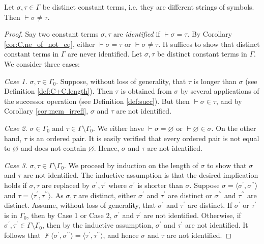 \begin{theorem}
    \label{thm:C.ne_of_isInΓ_and_distinct}
    \leanok
    Let $\sigma, \tau \in \Gamma$ be distinct constant terms, i.e. they are different strings of
    symbols. Then $\vdash \sigma \neq \tau$.
\end{theorem}

\begin{proof}
    Say two constant terms $\sigma, \tau$ are \textit{identified} if $\vdash \sigma = \tau$.
    By Corollary \ref{cor:C.ne_of_not_eq}, 
    either $\vdash \sigma = \tau$ or $\vdash \sigma \neq \tau$.
    It suffices to show that distinct constant terms in $\Gamma$ are never identified.
    Let $\sigma,\tau$ be distinct constant terms in $\Gamma$.
    We consider three cases:

    \textit{Case 1.} $\sigma, \tau \in \Gamma_0$. 
    Suppose, without loss of generality, that $\tau$ is longer than $\sigma$ 
    (see Definition \ref{def:C+C.length}).
    Then $\tau$ is obtained from $\sigma$ by several applications of the successor operation
    (see Definition \ref{def:succ}).
    But then $\vdash \sigma \in \tau$, and by Corollary \ref{cor:mem_irrefl},
    $\sigma$ and $\tau$ are not identified.

    \textit{Case 2.} $\sigma \in \Gamma_0$ and $\tau \in \Gamma \setminus \Gamma_0$.
    We either have $\vdash \sigma = \varnothing$ or $\vdash \varnothing \in \sigma$.
    On the other hand, $\tau$ is an ordered pair.
    It is easily verified that every ordered pair is not equal to $\varnothing$ and does not contain
    $\varnothing$. Hence, $\sigma$ and $\tau$ are not identified.

    \textit{Case 3.} $\sigma, \tau \in \Gamma \setminus \Gamma_0$.
    We proceed by induction on the length of $\sigma$ to show that 
    $\sigma$ and $\tau$ are not identified.
    The inductive assumption is that the desired implication holds if $\sigma, \tau$ are replaced by
    $\sigma^\prime, \tau^\prime$ where $\sigma^\prime$ is shorter than $\sigma$.
    Suppose $\sigma = \langle \sigma^\prime, \sigma^{\prime\prime} \rangle$ and 
    $\tau = \langle \tau^\prime, \tau^{\prime\prime} \rangle$.
    As $\sigma,\tau$ are distinct, either $\sigma^\prime$ and $\tau^\prime$ are distinct or
    $\sigma^{\prime\prime}$ and $\tau^{\prime\prime}$ are distinct.
    Assume, without loss of generality, that $\sigma^\prime$ and $\tau^\prime$ are distinct.
    If $\sigma^\prime$ or $\tau^\prime$ is in $\Gamma_0$, then by Case 1 or Case 2,
    $\sigma^\prime$ and $\tau^\prime$ are not identified.
    Otherwise, if $\sigma^\prime, \tau^\prime \in \Gamma \setminus \Gamma_0$, then by the inductive
    assumption, $\sigma^\prime$ and $\tau^\prime$ are not identified.
    It follows that $\not\vdash \langle \sigma^\prime, \sigma^{\prime\prime} \rangle =
    \langle \tau^\prime, \tau^{\prime\prime} \rangle$, and hence $\sigma$ and $\tau$ are not
    identified.
\end{proof}

